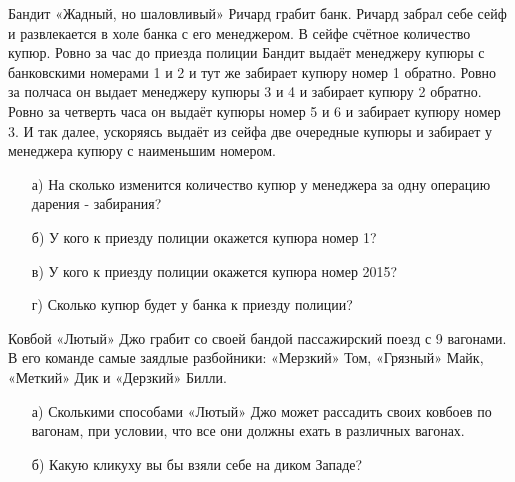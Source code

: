 \documentclass[12pt, a4paper, oneside]{article}
\begin{document}
\begin{problem}{5}
    Бандит «Жадный, но шаловливый» Ричард грабит банк. Ричард забрал себе сейф и развлекается в холе банка с его менеджером.  В сейфе счётное количество купюр. Ровно за час до приезда полиции Бандит выдаёт менеджеру купюры с банковскими номерами 1 и 2 и тут же забирает купюру номер 1 обратно. Ровно за полчаса он выдает менеджеру купюры 3 и 4 и забирает купюру 2 обратно.  Ровно за четверть часа он выдаёт купюры номер 5 и 6 и забирает купюру номер 3. И так далее, ускоряясь выдаёт из сейфа две очередные купюры и забирает у менеджера купюру с наименьшим номером.
    
    \begin{enumerate}
        \item[а)] На сколько изменится количество купюр у менеджера за одну операцию дарения - забирания?
        \item[б)] У кого к приезду полиции окажется купюра номер 1?
        \item[в)] У кого к приезду полиции окажется купюра номер 2015?
        \item[г)] Сколько купюр будет у банка к приезду полиции?
    \end{enumerate}
\end{problem}




\begin{problem}{5}
    Ковбой «Лютый» Джо грабит со своей бандой пассажирский поезд с 9 вагонами. В его команде самые заядлые разбойники: «Мерзкий» Том, «Грязный» Майк, «Меткий» Дик и «Дерзкий» Билли.  
    \begin{enumerate}
        \item[а)] Сколькими способами «Лютый» Джо может рассадить своих ковбоев по вагонам, при условии, что все они должны ехать в различных вагонах.
        \item[б)] Какую кликуху вы бы взяли себе на диком Западе?
    \end{enumerate}
\end{problem}
\end{document}
